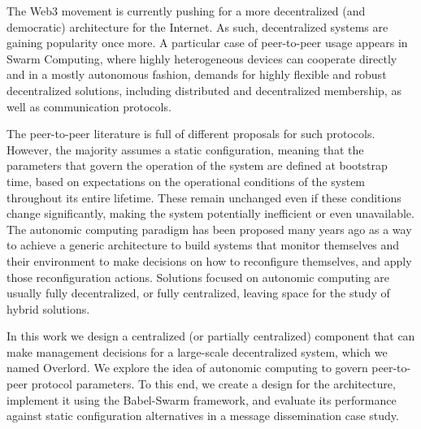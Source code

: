 
%

\par The Web3 movement is currently pushing for a more decentralized (and democratic) architecture for the Internet. As such, decentralized systems are gaining popularity once more. A particular case of peer-to-peer usage appears in Swarm Computing, where highly heterogeneous devices can cooperate directly and in a mostly autonomous fashion, demands for highly flexible and robust decentralized solutions, including distributed and decentralized membership, as well as communication protocols.
\par The peer-to-peer literature is full of different proposals for such protocols. However, the majority assumes a static configuration, meaning that the parameters that govern the operation of the system are defined at bootstrap time, based on expectations on the operational conditions of the system throughout its entire lifetime. These remain unchanged even if these conditions change significantly, making the system potentially inefficient or even unavailable. The autonomic computing paradigm has been proposed many years ago as a way to achieve a generic architecture to build systems that monitor themselves and their environment to make decisions on how to reconfigure themselves, and apply those reconfiguration actions. Solutions focused on autonomic computing are usually fully decentralized, or fully centralized, leaving space for the study of hybrid solutions.
\par In this work we design a centralized (or partially centralized) component that can make management decisions for a large-scale decentralized system, which we named Overlord. We explore the idea of autonomic computing to govern peer-to-peer protocol parameters. To this end, we create a design for the architecture, implement it using the Babel-Swarm framework, and evaluate its performance against static configuration alternatives in a message dissemination case study.

